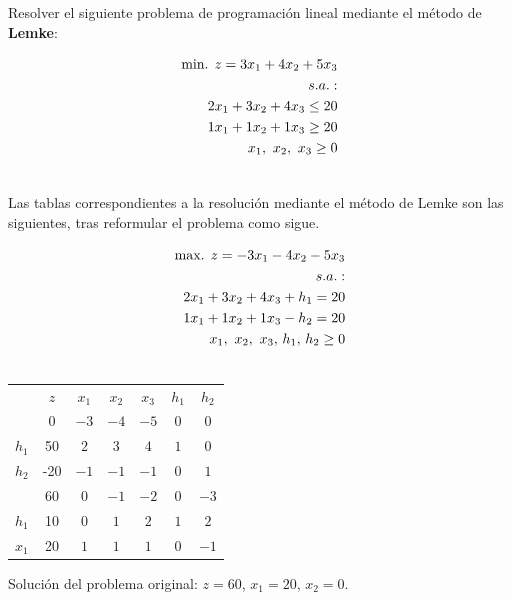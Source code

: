 Resolver el siguiente problema de programación lineal mediante el método de \textbf{Lemke}:

\begin{equation}
\begin{split}
\mbox{min. } z = 3x_1 + 4x_2 + 5x_3 \\
s.a.:\\
2x_1 + 3x_2 + 4x_3 \leq 20\\
1x_1 + 1x_2 + 1x_3 \geq 20\\
x_1,\,\,x_2,\,\,x_3\geq 0\\
\notag
\end{split}
\end{equation}

Las tablas correspondientes a la resolución mediante el método de Lemke son las siguientes, tras reformular el problema como sigue.


\begin{equation}
\begin{split}
\mbox{max. } z = -3x_1 - 4x_2 - 5x_3 \\
s.a.:\\
2x_1 + 3x_2 + 4x_3 + h_1 = 20\\
1x_1 + 1x_2 + 1x_3 - h_2 = 20\\
x_1,\,\,x_2,\,\,x_3,\,h_1,\, h_2\geq 0\\
\notag
\end{split}
\end{equation}

\begin{center}
\begin{tabular}{c|c|ccccc|}
 & $z$ & $x_1$ & $x_2$ & $x_3$ & $h_1$ & $h_2$\\ 
 & $0$ & $-3$ & $-4$ & $-5$ & $0$ & $0$ \\ 
\hline
$h_1$ & 50  & $2$ & $3$ & $4$ & $1$ & $0$\\ 
$h_2$ & -20  & $-1$ & $-1$ & $-1$ & $0$ & $1$\\ 
\hline
 & $60$ & $0$ & $-1$ & $-2$ & $0$ & $-3$ \\ 
\hline
$h_1$ & 10  & $0$ & $1$ & $2$ & $1$ & $2$\\ 
$x_1$ & 20  & $1$ & $1$ & $1$ & $0$ & $-1$\\ 
\hline
\end{tabular}
\end{center}

Solución del problema original: $z=60$, $x_1=20$, $x_2=0$.
